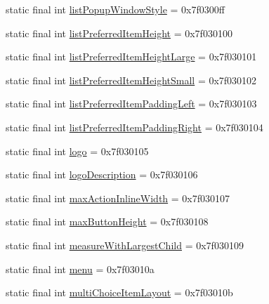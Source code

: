 \begin{DoxyCompactItemize}
\item 
static final int \mbox{\hyperlink{classandroid_1_1support_1_1design_1_1R_1_1attr_acf2c1b6bb6704c1f06dbe90919c79260}{list\+Popup\+Window\+Style}} = 0x7f0300ff
\item 
static final int \mbox{\hyperlink{classandroid_1_1support_1_1design_1_1R_1_1attr_ac146c33bf42aacb55e4473dac7bf0fd4}{list\+Preferred\+Item\+Height}} = 0x7f030100
\item 
static final int \mbox{\hyperlink{classandroid_1_1support_1_1design_1_1R_1_1attr_a26d81f51fda6b3aaf060fb3825462686}{list\+Preferred\+Item\+Height\+Large}} = 0x7f030101
\item 
static final int \mbox{\hyperlink{classandroid_1_1support_1_1design_1_1R_1_1attr_ae7b6ec3bd46a7fbd1938d23ec3f57839}{list\+Preferred\+Item\+Height\+Small}} = 0x7f030102
\item 
static final int \mbox{\hyperlink{classandroid_1_1support_1_1design_1_1R_1_1attr_ac75887474ec5c89c252beb2b064a0eee}{list\+Preferred\+Item\+Padding\+Left}} = 0x7f030103
\item 
static final int \mbox{\hyperlink{classandroid_1_1support_1_1design_1_1R_1_1attr_a2d502456002007ee5f878ec50be47732}{list\+Preferred\+Item\+Padding\+Right}} = 0x7f030104
\item 
static final int \mbox{\hyperlink{classandroid_1_1support_1_1design_1_1R_1_1attr_a6cb97c1d0d1533a2cc41e9986396106c}{logo}} = 0x7f030105
\item 
static final int \mbox{\hyperlink{classandroid_1_1support_1_1design_1_1R_1_1attr_a123f4a014736d0e9ef5f5107f31ff5a2}{logo\+Description}} = 0x7f030106
\item 
static final int \mbox{\hyperlink{classandroid_1_1support_1_1design_1_1R_1_1attr_a81c927e3906843a45e2c66052578cb03}{max\+Action\+Inline\+Width}} = 0x7f030107
\item 
static final int \mbox{\hyperlink{classandroid_1_1support_1_1design_1_1R_1_1attr_ad6bd48f1f9241d8d9d51d7e07a5dc414}{max\+Button\+Height}} = 0x7f030108
\item 
static final int \mbox{\hyperlink{classandroid_1_1support_1_1design_1_1R_1_1attr_abd4901da4b129c6f63b6ea0541aa8e09}{measure\+With\+Largest\+Child}} = 0x7f030109
\item 
static final int \mbox{\hyperlink{classandroid_1_1support_1_1design_1_1R_1_1attr_a0b206635c3ea3883eb3af84863d37584}{menu}} = 0x7f03010a
\item 
static final int \mbox{\hyperlink{classandroid_1_1support_1_1design_1_1R_1_1attr_abc4a87a62e1572b883a67aa399ffe35e}{multi\+Choice\+Item\+Layout}} = 0x7f03010b

\end{DoxyCompactItemize}
